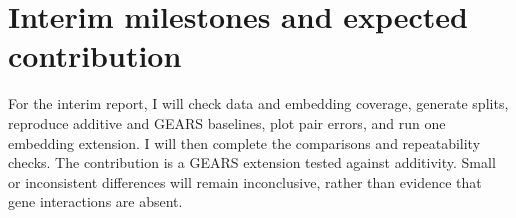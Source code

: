\documentclass[11pt,letterpaper]{article}
\begin{document}
\section{Interim milestones and expected contribution}

For the interim report, I will check data and embedding coverage, generate splits, reproduce additive and GEARS baselines, plot pair errors, and run one embedding extension. I will then complete the comparisons and repeatability checks. The contribution is a GEARS extension tested against additivity. Small or inconsistent differences will remain inconclusive, rather than evidence that gene interactions are absent.

{\footnotesize


}
\end{document}
